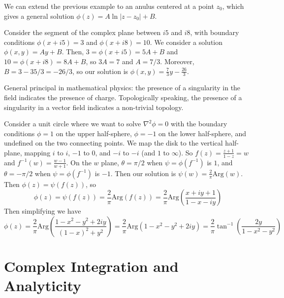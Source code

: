 \documentclass[12pt, a4paper, oneside, openright, titlepage]{book}
\begin{document}
\begin{eg}
    We can extend the previous example to an anulus centered at a point $z_0$, which gives a general solution $\phi(z) = A\ln|z-z_0|+B$.
\end{eg}


\begin{eg}
    Consider the segment of the complex plane between $i5$ and $i8$, with boundary conditions $\phi(x+i5) = 3$ and $\phi(x+i8) = 10$. We consider a solution $\phi(x,y) = Ay+B$. Then, $3 = \phi(x+i5) = 5A+B$ and $10 = \phi(x+i8) = 8A+B$, so $3A = 7$ and $A = 7/3$. Moreover, $B = 3 - 35/3 = -26/3$, so our solution is $\phi(x,y) = \frac{7}{3}y - \frac{26}{3}$.
\end{eg}

General principal in mathematical physics: the presence of a singularity in the field indicates the presence of charge. Topologically speaking, the presence of a singularity in a vector field indicates a non-trivial topology.


\begin{eg}
    Consider a unit circle where we want to solve $\nabla^2\phi = 0$ with the boundary conditions $\phi = 1$ on the upper half-sphere, $\phi = -1$ on the lower half-sphere, and undefined on the two connecting points. We map the disk to the vertical half-plane, mapping $i$ to $i$, $-1$ to $0$, and $-i$ to $-i$ (and $1$ to $\infty$). So $f(z) = \frac{z+1}{1-z} = w$ and $f^{-1}(w) = \frac{w-1}{w+1}$. On the $w$ plane, $\theta = \pi/2$ when $\psi = \phi(f^{-1})$ is $1$, and $\theta = -\pi/2$ when $\psi = \phi(f^{-1})$ is $-1$. Then our solution is $\psi(w) = \frac{2}{\pi}\text{Arg}(w)$. Then $\phi(z) = \psi(f(z))$, so \begin{equation*}
        \phi(z) = \psi(f(z)) = \frac{2}{\pi}\text{Arg}(f(z)) = \frac{2}{\pi}\text{Arg}\left(\frac{x+iy+1}{1-x-iy}\right)
    \end{equation*}
    Then simplifying we have \begin{equation*}
        \phi(z) = \frac{2}{\pi} \text{Arg}\left(\frac{1-x^2-y^2+2iy}{(1-x)^2+y^2}\right) = \frac{2}{\pi}\text{Arg}(1-x^2-y^2+2iy) = \frac{2}{\pi}\tan^{-1}\left(\frac{2y}{1-x^2-y^2}\right)
    \end{equation*}
\end{eg}




\chapter{Complex Integration and Analyticity}
\end{document}
